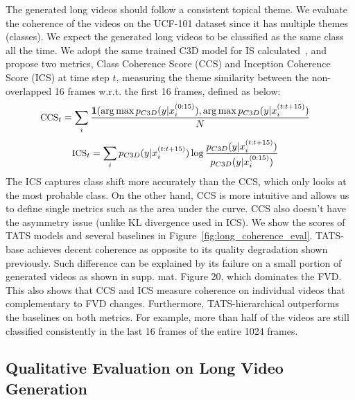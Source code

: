  The generated long videos should follow a consistent topical theme.
We evaluate the coherence of the videos on the UCF-101 dataset since it has multiple themes (classes). We expect the generated long videos to be classified as the same class all the time. We adopt the same trained C3D model for IS calculated~\cite{saito2020train}, and propose two metrics, Class Coherence Score (CCS) and Inception Coherence Score (ICS) at time step $t$, measuring the theme similarity between the non-overlapped 16 frames w.r.t. the first 16 frames, defined as below:
\begin{align*}
\small
\text{CCS}_t &= \sum_{i} \frac{\mathbf{1} (\argmax p_{C3D}(y|x_i^{(0:15)}), \argmax p_{C3D}(y|x_i^{(t:t+15)})}{N}
\end{align*}
\begin{align*}
\small
\text{ICS}_t &= \sum_{i} p_{C3D}(y|x_i^{(t:t+15)}) \log{\frac{p_{C3D}(y|x_i^{(t:t+15)})}{p_{C3D}(y|x_i^{(0:15)})}}
\end{align*}
The ICS captures class shift more accurately than the CCS, which only looks at the most probable class. On the other hand, CCS is more intuitive and allows us to define single metrics such as the area under the curve. CCS also doesn't have the asymmetry issue (unlike KL divergence used in ICS). We show the scores of TATS models and several baselines in Figure~\ref{fig:long_coherence_eval}. TATS-base achieves decent coherence as opposite to its quality degradation shown previously. Such difference can be explained by its failure on a small portion of generated videos as shown in supp. mat. Figure 20, which dominates the FVD. This also shows that CCS and ICS measure coherence on individual videos that complementary to FVD changes. Furthermore, TATS-hierarchical outperforms the baselines on both metrics. For example, more than half of the videos are still classified consistently in the last 16 frames of the entire 1024 frames.



\subsection{Qualitative Evaluation on Long Video Generation}

